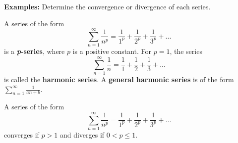 \noindent\textbf{Examples:} Determine the convergence or divergence of each series.

\newpage

\begin{tcolorbox}[title= DEFINITION OF A $p$-SERIES,colframe=black,sharp corners,colback=white,colbacktitle=white,coltitle=black]

    A series of the form \[\displaystyle\sum_{n=1}^\infty \frac{1}{n^p}=\frac{1}{1^p}+\frac{1}{2^p}+\frac{1}{3^p}+...\] is a \textbf{\textit{p}-series}, where $p$ is a positive constant. For $p=1$, the series \[\sum_{n=1}^\infty\frac{1}{n}=\frac{1}{1}+\frac{1}{2}+\frac{1}{3}+...\]
    is called the \textbf{harmonic series}. A \textbf{general harmonic series} is of the form $\displaystyle\sum_{n=1}^\infty\frac{1}{an+b}$.

\end{tcolorbox}
\begin{tcolorbox}[title= CONVERGENCE OF A $p$-SERIES,colframe=black,sharp corners,colback=white,colbacktitle=white,coltitle=black]

    A series of the form \[\displaystyle\sum_{n=1}^\infty \frac{1}{n^p}=\frac{1}{1^p}+\frac{1}{2^p}+\frac{1}{3^p}+...\] converges if $p>1$ and diverges if $0<p\le1$.

\end{tcolorbox}
\vspace{.1cm}

